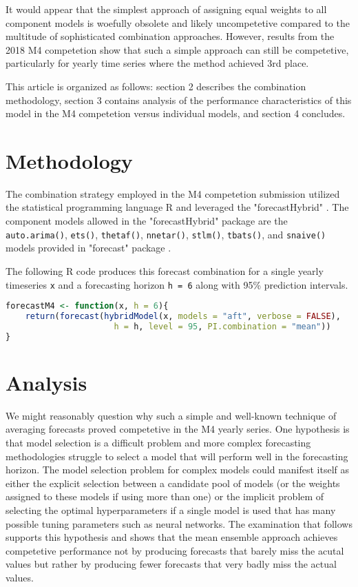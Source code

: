 \documentclass[11pt,3p,review,authoryear]{elsarticle}
\begin{document}
It would appear that the simplest approach of assigning equal weights to all component models is woefully obsolete and likely uncompetetive compared to the multitude of sophisticated combination approaches. However, results from the 2018 M4 competetion show that such a simple approach can still be competetive, particularly for yearly time series where the method achieved 3rd place.

This article is organized as follows: section 2 describes the combination methodology, section 3 contains analysis of the performance characteristics of this model in the M4 competetion versus individual models, and section 4 concludes.

\section{Methodology}
The combination strategy employed in the M4 competetion submission utilized the statistical programming language R \citep{Rlang} and leveraged the "forecastHybrid" \citep{forecastHybrid}. The component models allowed in the "forecastHybrid" package are the  \lstinline{auto.arima()}, \lstinline{ets()}, \lstinline{thetaf()}, \lstinline{nnetar()}, \lstinline{stlm()}, \lstinline{tbats()}, and \lstinline{snaive()} models provided in "forecast" package \citep{Forecast}.


The following R code produces this forecast combination for a single yearly timeseries \lstinline{x} and a forecasting horizon \lstinline{h = 6} along with 95\% prediction intervals.
\begin{lstlisting}[language=R]
forecastM4 <- function(x, h = 6){
    return(forecast(hybridModel(x, models = "aft", verbose = FALSE),
                      h = h, level = 95, PI.combination = "mean"))
}
\end{lstlisting}

\section{Analysis}
We might reasonably question why such a simple and well-known technique of averaging forecasts proved competetive in the M4 yearly series. One hypothesis is that model selection is a difficult problem and more complex forecasting methodologies struggle to select a model that will perform well in the forecasting horizon. The model selection problem for complex models could manifest itself as either the explicit selection between a candidate pool of models (or the weights assigned to these models if using more than one) or the implicit problem of selecting the optimal hyperparameters if a single model is used that has many possible tuning parameters such as neural networks. The examination that follows supports this hypothesis and shows that the mean ensemble approach achieves competetive performance not by producing forecasts that barely miss the acutal values but rather by producing fewer forecasts that very badly miss the actual values.
\end{document}
